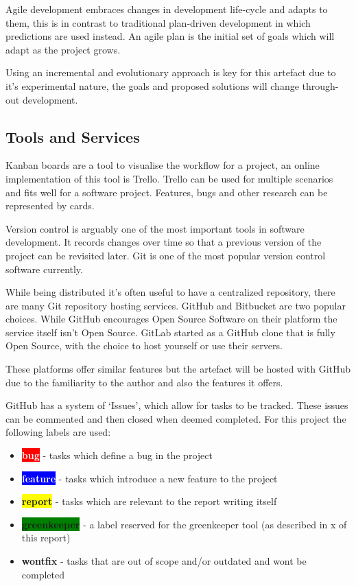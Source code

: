Agile development embraces changes in development life-cycle and adapts to them, this is in contrast to traditional plan-driven development in which predictions are used instead. An agile plan is the initial set of goals which will adapt as the project grows. \cite{fowler_agile}

Using an incremental and evolutionary approach is key for this artefact due to it's experimental nature, the goals and proposed solutions will change through-out development.

\subsection{Tools and Services} \label{a-d--methodology--tools}

Kanban boards are a tool to visualise the workflow for a project, an online implementation of this tool is Trello. Trello can be used for multiple scenarios and fits well for a software project. Features, bugs and other research can be represented by cards. \cite{trello} %

Version control is arguably one of the most important tools in software development. It records changes over time so that a previous version of the project can be revisited later. Git is one of the most popular version control software currently. \cite{git}

While being distributed it's often useful to have a centralized repository, there are many Git repository hosting services. GitHub and Bitbucket are two popular choices. While GitHub encourages Open Source Software on their platform the service itself isn't Open Source. \cite{github} GitLab started as a GitHub clone that is fully Open Source, with the choice to host yourself or use their servers. \cite{gitlab} \cite{bitbucket}

These platforms offer similar features but the artefact will be hosted with GitHub due to the familiarity to the author and also the features it offers.

GitHub has a system of `Issues', which allow for tasks to be tracked. These issues can be commented and then closed when deemed completed. For this project the following labels are used:

\begin{itemize}
  \item \textbf{\colorbox{red}{\textcolor{white}{bug}}} - tasks which define a bug in the project
  \item \textbf{\colorbox{blue}{\textcolor{white}{feature}}} -  tasks which introduce a new feature to the project
  \item \textbf{\colorbox{yellow}{report}} - tasks which are relevant to the report writing itself
  \item \textbf{\colorbox{green}{greenkeeper}} - a label reserved for the greenkeeper tool (as described in x of this report)
  \item \textbf{wontfix} - tasks that are out of scope and/or outdated and wont be completed
\end{itemize}


